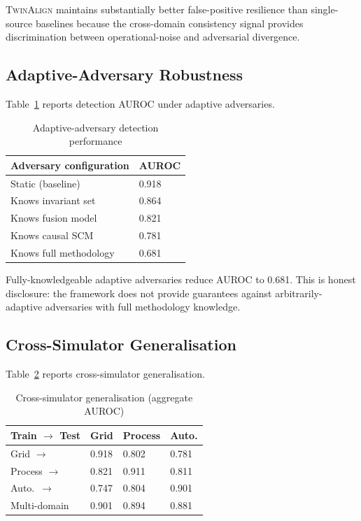 \documentclass[sigconf,nonacm]{acmart}
\begin{document}
\textsc{TwinAlign} maintains substantially better false-positive
resilience than single-source baselines because the cross-domain
consistency signal provides discrimination between
operational-noise and adversarial divergence.

\subsection{Adaptive-Adversary Robustness}

Table~\ref{tab:adaptive} reports detection AUROC under adaptive
adversaries.

\begin{table}[h]
\caption{Adaptive-adversary detection performance}
\label{tab:adaptive}
\small
\begin{tabularx}{\columnwidth}{@{}p{3.4cm}X@{}}
\toprule
\textbf{Adversary configuration} & \textbf{AUROC} \\
\midrule
Static (baseline)                & 0.918 \\
Knows invariant set              & 0.864 \\
Knows fusion model               & 0.821 \\
Knows causal SCM                 & 0.781 \\
Knows full methodology           & 0.681 \\
\bottomrule
\end{tabularx}
\end{table}

Fully-knowledgeable adaptive adversaries reduce AUROC to 0.681.
This is honest disclosure: the framework does not provide
guarantees against arbitrarily-adaptive adversaries with full
methodology knowledge.

\subsection{Cross-Simulator Generalisation}

Table~\ref{tab:cross} reports cross-simulator generalisation.

\begin{table}[h]
\caption{Cross-simulator generalisation (aggregate AUROC)}
\label{tab:cross}
\small
\begin{tabularx}{\columnwidth}{@{}p{2.0cm}X X X@{}}
\toprule
\textbf{Train $\to$ Test} & \textbf{Grid} & \textbf{Process} & \textbf{Auto.} \\
\midrule
Grid $\to$            & 0.918 & 0.802 & 0.781 \\
Process $\to$         & 0.821 & 0.911 & 0.811 \\
Auto.\ $\to$          & 0.747 & 0.804 & 0.901 \\
Multi-domain          & 0.901 & 0.894 & 0.881 \\
\bottomrule
\end{tabularx}
\end{table}
\end{document}
